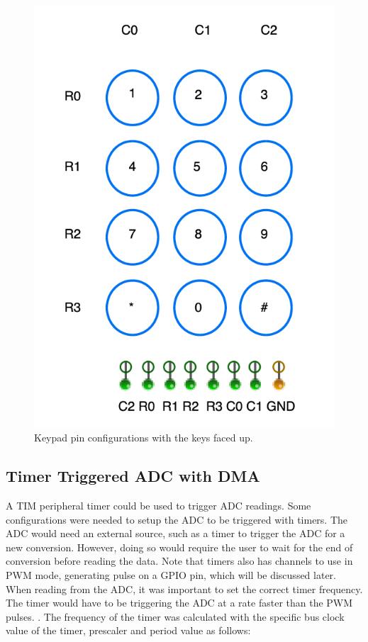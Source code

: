 \documentclass[a4paper,titlepage]{article}
\begin{document}
\begin{figure}[!htb]
  \centering
  \includegraphics[width=\columnwidth]{figures/keypad_pins.png}
  \caption
{Keypad pin configurations with the keys faced up.}  \label{fig:keypad_pins}
\end{figure}

\subsection{Timer Triggered ADC with DMA}
A TIM peripheral timer could be used to trigger ADC readings. Some configurations were needed to setup the ADC to be triggered with timers. The ADC would need an external source, such as a timer to trigger the ADC for a new conversion. However, doing so would require the user to wait for the end of conversion before reading the data. Note that timers also has channels to use in PWM mode, generating pulse on a GPIO pin, which will be discussed later. When reading from the ADC, it was important to set the correct timer frequency. The timer would have to be triggering the ADC at a rate faster than the PWM pulses.  . The frequency of the timer was calculated with the specific bus clock value of the timer, prescaler and period value as follows:
\end{document}
